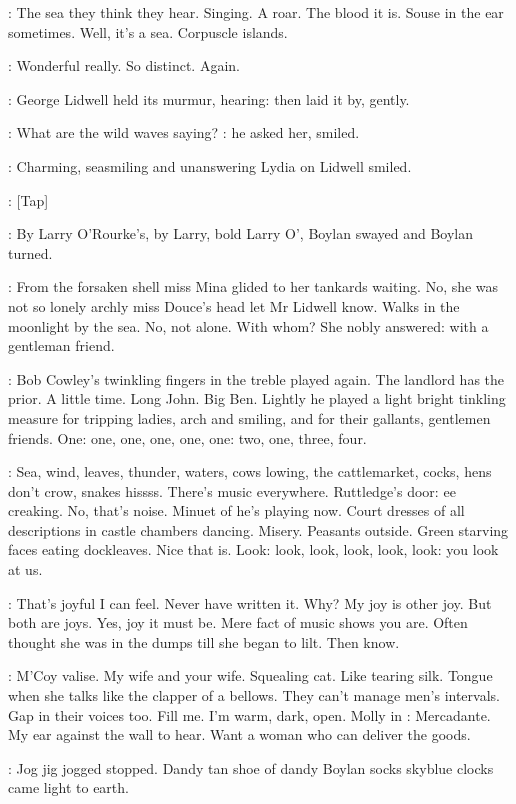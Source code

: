 \BloomInt:
The sea they think they hear. Singing. A roar. The blood it is. Souse
in the ear sometimes. Well, it's a sea. Corpuscle islands.

\Lidwell:
Wonderful really. So distinct. Again.

:
George Lidwell held its murmur,
hearing: then laid it by, gently.

\Lidwell:
What are the wild waves saying?
:
he asked her, smiled.

:
Charming, seasmiling and unanswering
Lydia on Lidwell smiled.

\Stripling:
[Tap]

:
By Larry O'Rourke's, by Larry, bold Larry O', Boylan swayed and
Boylan turned.

:
From the forsaken shell miss Mina glided to her tankards waiting.
No, she was not so lonely archly miss Douce's head let Mr Lidwell know.
Walks in the moonlight by the sea. No, not alone. With whom? She nobly
answered: with a gentleman friend.

:
Bob Cowley's twinkling fingers in the treble played again. The
landlord has the prior. A little time. Long John. Big Ben. Lightly he
played a light bright tinkling measure for tripping ladies,
arch and
smiling, and for their gallants, gentlemen friends. One: one, one, one,
one, one: two, one, three, four.

\BloomInt:
Sea, wind, leaves, thunder, waters, cows lowing, the cattlemarket,
cocks, hens don't crow, snakes hissss. There's music everywhere.
Ruttledge's door: ee creaking. No, that's noise. Minuet of
he's playing now. Court dresses of all descriptions in castle chambers
dancing. Misery. Peasants outside. Green starving faces eating
dockleaves. Nice that is. Look: look, look, look, look, look: you
look at us.

\BloomInt:
That's joyful I can feel. Never have written it. Why? My joy is other
joy. But both are joys.
Yes, joy it must be. Mere fact of music shows you
are. Often thought she was in the dumps till she began to lilt. Then
know.

\BloomInt:
M'Coy valise. My wife and your wife. Squealing cat. Like tearing silk.
Tongue when she talks like the clapper of a bellows. They can't manage
men's intervals. Gap in their voices too. Fill me. I'm warm, dark, open.
Molly in :
Mercadante. My ear against the wall to hear. Want
a woman who can deliver the goods.

\BloomInt:
Jog jig jogged stopped. Dandy tan shoe of dandy Boylan socks
skyblue clocks came light to earth.

